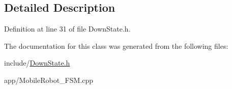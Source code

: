 \subsection{Detailed Description}


Definition at line 31 of file Down\+State.\+h.



The documentation for this class was generated from the following files\+:\begin{DoxyCompactItemize}
\item 
include/\mbox{\hyperlink{_down_state_8h}{Down\+State.\+h}}\item 
app/Mobile\+Robot\+\_\+\+F\+S\+M.\+cpp\end{DoxyCompactItemize}
